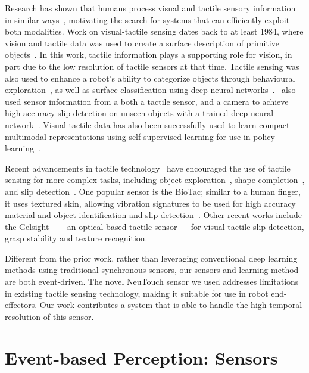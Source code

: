 \documentclass[fyp]{socreport}
\begin{document}
Research has shown that humans process visual and tactile sensory information in
similar ways~\cite{Lacey:2015}, motivating the search for systems that can
efficiently exploit both modalities. Work on visual-tactile sensing dates back
to at least 1984, where vision and tactile data was used to create a surface
description of primitive objects~\cite{allenil_surfac}. In this work, tactile
information plays a supporting role for vision, in part due to the low
resolution of tactile sensors at that time. Tactile sensing was also used to
enhance a robot's ability to categorize objects through behavioural
exploration~\cite{sinapov14_learn}, as well as surface classification using deep
neural
networks~\cite{gao2016deep}.~\citeauthor{li18_slip_detec_combin_tactil_visual_infor}
also used sensor information from a both a tactile sensor, and a camera to
achieve high-accuracy slip detection on unseen objects with a trained deep
neural network~\cite{li18_slip_detec_combin_tactil_visual_infor}. Visual-tactile
data has also been successfully used to learn compact multimodal representations
using self-supervised learning for use in policy learning~\cite{lee2019making}.

Recent advancements in tactile technology~\cite{shan2017robotic} have encouraged
the use of tactile sensing for more complex tasks, including object
exploration~\cite{liu2016visual}, shape completion~\cite{varley2017visual}, and
slip detection~\cite{reinecke2014experimental,calandra2018more}. One popular
sensor is the BioTac; similar to a human finger, it uses textured skin, allowing
vibration signatures to be used for high accuracy material and object
identification and slip detection~\cite{su2015force}. Other recent works include
the Gelsight~\cite{yuan2017gelsight} --- an optical-based tactile sensor --- for
visual-tactile slip detection, grasp stability and texture recognition.

Different from the prior work, rather than leveraging conventional deep learning
methods using traditional synchronous sensors, our sensors and learning method
are both event-driven. The novel NeuTouch sensor we used addresses limitations
in existing tactile sensing technology, making it suitable for use in robot
end-effectors. Our work contributes a system that is able to handle the high
temporal resolution of this sensor.

\section{Event-based Perception: Sensors}
\end{document}
